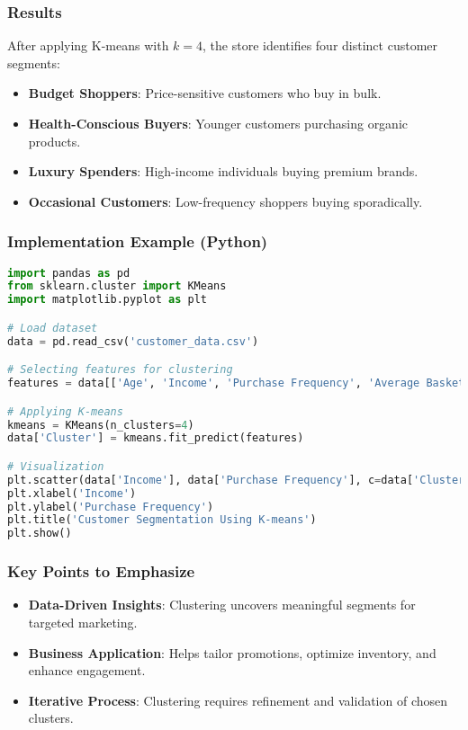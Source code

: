 \documentclass[aspectratio=169]{beamer}
\begin{document}
\begin{frame}[fragile]
    \frametitle{Results}
    After applying K-means with $k=4$, the store identifies four distinct customer segments:
    \begin{itemize}
        \item \textbf{Budget Shoppers}: Price-sensitive customers who buy in bulk.
        \item \textbf{Health-Conscious Buyers}: Younger customers purchasing organic products.
        \item \textbf{Luxury Spenders}: High-income individuals buying premium brands.
        \item \textbf{Occasional Customers}: Low-frequency shoppers buying sporadically.
    \end{itemize}
\end{frame}

\begin{frame}[fragile]
    \frametitle{Implementation Example (Python)}
    \begin{lstlisting}[language=Python]
import pandas as pd
from sklearn.cluster import KMeans
import matplotlib.pyplot as plt

# Load dataset
data = pd.read_csv('customer_data.csv')

# Selecting features for clustering
features = data[['Age', 'Income', 'Purchase Frequency', 'Average Basket Size']]

# Applying K-means
kmeans = KMeans(n_clusters=4)
data['Cluster'] = kmeans.fit_predict(features)

# Visualization
plt.scatter(data['Income'], data['Purchase Frequency'], c=data['Cluster'], cmap='viridis')
plt.xlabel('Income')
plt.ylabel('Purchase Frequency')
plt.title('Customer Segmentation Using K-means')
plt.show()
    \end{lstlisting}
\end{frame}

\begin{frame}[fragile]
    \frametitle{Key Points to Emphasize}
    \begin{itemize}
        \item \textbf{Data-Driven Insights}: Clustering uncovers meaningful segments for targeted marketing.
        \item \textbf{Business Application}: Helps tailor promotions, optimize inventory, and enhance engagement.
        \item \textbf{Iterative Process}: Clustering requires refinement and validation of chosen clusters.
    \end{itemize}
\end{frame}
\end{document}

